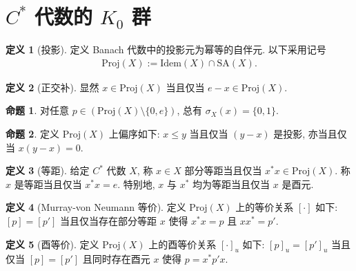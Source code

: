\documentclass{MainStyle}
\theoremstyle{definition}
\theoremstyle{definition}
\theoremstyle{definition}
\newtheorem{definition}{定义}
\theoremstyle{definition}
\newtheorem{proposition}{命题}
\theoremstyle{definition}
\theoremstyle{definition}
\theoremstyle{definition}
\theoremstyle{remark}
\theoremstyle{remark}
\begin{document}
\maketitle

\section{\texorpdfstring{$C^\ast$}{} 代数的 \texorpdfstring{$K_0$}{} 群}

\begin{definition}[投影]
    定义 Banach 代数中的投影元为幂等的自伴元. 以下采用记号
    \begin{align*}
        \mathrm{Proj}(X):=\mathrm{Idem}(X)\cap \mathrm{SA}(X).
    \end{align*}
\end{definition}

\begin{definition}[正交补]
    显然 $x\in \mathrm{Proj}(X)$ 当且仅当 $e-x\in \mathrm{Proj}(X)$.
\end{definition}

\begin{proposition}
    对任意 $p\in (\mathrm{Proj}(X)\setminus \{0,e\})$, 总有 $\sigma_X(x)=\{0,1\}$.
\end{proposition}

\begin{proposition}
    定义 $\mathrm{Proj}(X)$ 上偏序如下: $x\leq y$ 当且仅当 $(y-x)$ 是投影, 亦当且仅当 $x(y-x)=0$.
\end{proposition}

\begin{definition}[等距]
    给定 $C^\ast $ 代数 $X$, 称 $x\in X$ 部分等距当且仅当 $x^\ast x\in \mathrm{Proj}(X)$. 称 $x$ 是等距当且仅当 $x^\ast x=e$. 特别地, $x$ 与 $x^\ast$ 均为等距当且仅当 $x$ 是酉元.
\end{definition}

\begin{definition}[Murray-von Neumann 等价]
    定义 $\mathrm{Proj}(X)$ 上的等价关系 $[\cdot ]$ 如下: $[p]=[p']$ 当且仅当存在部分等距 $x$ 使得 $x^\ast x=p$ 且 $xx^\ast =p'$.
\end{definition}

\begin{definition}[酉等价]
    定义 $\mathrm{Proj}(X)$ 上的酉等价关系 $[\cdot ]_u$ 如下: $[p]_u=[p']_u$ 当且仅当 $[p]=[p']$ 且同时存在酉元 $x$ 使得 $p=x^\ast p'x$.
\end{definition}
\end{document}
